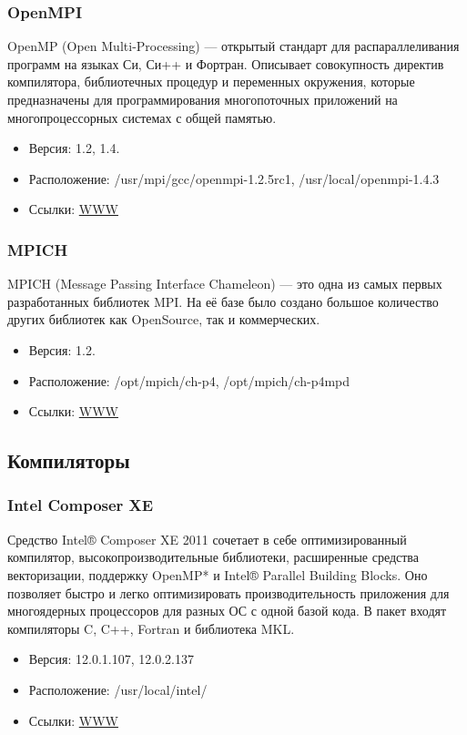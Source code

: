 \documentclass[a4paper,8pt]{extreport}
\begin{document}
\subsubsection{OpenMPI}
OpenMP (Open Multi-Processing) — открытый стандарт для распараллеливания программ на языках Си, Си++ и Фортран.
Описывает совокупность директив компилятора, библиотечных процедур и переменных окружения, которые предназначены 
для программирования многопоточных приложений на многопроцессорных системах с общей памятью.
\begin{itemize}
 \item Версия: 1.2, 1.4.
 \item Расположение: /usr/mpi/gcc/openmpi-1.2.5rc1, /usr/local/openmpi-1.4.3
 \item Ссылки: \href{http://www.open-mpi.org/}{WWW}
\end{itemize}

\subsubsection{MPICH}
MPICH (Message Passing Interface Chameleon) — это одна из самых первых разработанных библиотек MPI. 
На её базе было создано большое количество других библиотек как OpenSource, так и коммерческих.

\begin{itemize}
 \item Версия: 1.2.
 \item Расположение: /opt/mpich/ch-p4, /opt/mpich/ch-p4mpd
 \item Ссылки: \href{http://www.mcs.anl.gov/research/projects/mpich2/}{WWW}
\end{itemize}

\subsection{Компиляторы}
\subsubsection{Intel Composer XE}
Средство Intel® Composer XE 2011 сочетает в себе оптимизированный компилятор, высокопроизводительные библиотеки,
расширенные средства векторизации, поддержку OpenMP* и Intel® Parallel Building Blocks. Оно позволяет быстро и
легко оптимизировать производительность приложения для многоядерных процессоров для разных ОС с одной базой кода.
В пакет входят компиляторы C, C++, Fortran и библиотека MKL.
\begin{itemize}
 \item Версия: 12.0.1.107, 12.0.2.137
 \item Расположение: /usr/local/intel/
 \item Ссылки: \href{http://software.intel.com/en-us/articles/intel-composer-xe/}{WWW}
\end{itemize}
\end{document}
